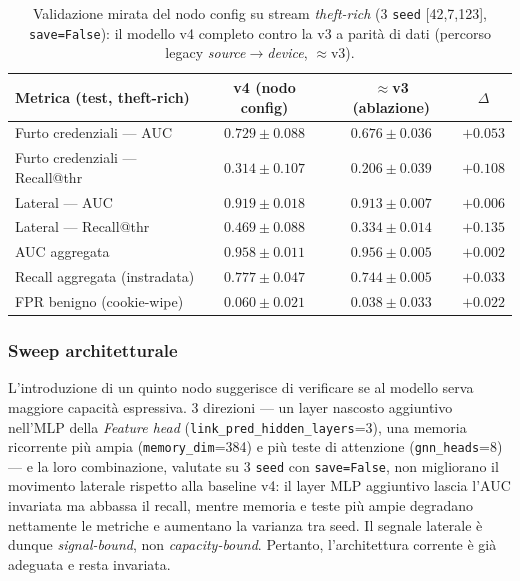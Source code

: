 \begin{table}[ht!]
\centering
\renewcommand{\arraystretch}{1.4}
\begin{tabular}{l c c c}
\hline
\textbf{Metrica (test, theft-rich)} & \textbf{v4 (nodo config)} & \textbf{$\approx$v3 (ablazione)} & $\Delta$ \\
\hline
Furto credenziali --- AUC        & $0.729\pm0.088$ & $0.676\pm0.036$ & $+0.053$ \\
Furto credenziali --- Recall@thr & $\mathbf{0.314}\pm0.107$ & $0.206\pm0.039$ & $+0.108$ \\
\hline
Lateral --- AUC                  & $0.919\pm0.018$ & $0.913\pm0.007$ & $+0.006$ \\
Lateral --- Recall@thr           & $\mathbf{0.469}\pm0.088$ & $0.334\pm0.014$ & $+0.135$ \\
\hline
AUC aggregata                    & $0.958\pm0.011$ & $0.956\pm0.005$ & $+0.002$ \\
Recall aggregata (instradata)    & $0.777\pm0.047$ & $0.744\pm0.005$ & $+0.033$ \\
FPR benigno (cookie-wipe)        & $0.060\pm0.021$ & $0.038\pm0.033$ & $+0.022$ \\
\hline
\end{tabular}
\caption{Validazione mirata del nodo config su stream \emph{theft-rich} (3 \texttt{seed} [42,7,123], \texttt{save=False}): il modello v4 completo contro la v3 a parità di dati (percorso legacy \textit{source}$\rightarrow$\textit{device}, $\approx$v3).}
\label{tab:theft}
\end{table}

\subsubsection{Sweep architetturale}
\label{sec:archsweep}

L'introduzione di un quinto nodo suggerisce di verificare se al modello serva maggiore capacità espressiva. 3 direzioni --- un layer nascosto aggiuntivo nell'MLP della \textit{Feature head} (\texttt{link\_pred\_hidden\_layers}=3), una memoria ricorrente più ampia (\texttt{memory\_dim}=384) e più teste di attenzione (\texttt{gnn\_heads}=8) --- e la loro combinazione, valutate su 3 \texttt{seed} con \texttt{save=False}, non migliorano il movimento laterale rispetto alla baseline v4: il layer MLP aggiuntivo lascia l'AUC invariata ma abbassa il recall, mentre memoria e teste più ampie degradano nettamente le metriche e aumentano la varianza tra seed. Il segnale laterale è dunque \textit{signal-bound}, non \textit{capacity-bound}. Pertanto, l'architettura corrente è già adeguata e resta invariata.


